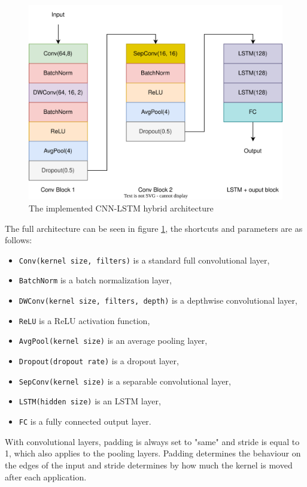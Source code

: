 \documentclass[english, he, bc, kiv, iso690alph, viewonly]{fasthesis}
\begin{document}
\begin{figure}
	\centering
	\includegraphics[width=\textwidth]{fig/arch}
	\caption{The implemented CNN-LSTM hybrid architecture}
	\label{fig:arch}
\end{figure}

The full architecture can be seen in figure \ref{fig:arch}, the shortcuts and parameters are as follows:

\begin{itemize}
	\item\texttt{Conv(kernel size, filters)} is a standard full convolutional layer,
	\item\texttt{BatchNorm} is a batch normalization layer,
	\item\texttt{DWConv(kernel size, filters, depth)} is a depthwise convolutional layer,
	\item\texttt{ReLU} is a ReLU activation function,
	\item\texttt{AvgPool(kernel size)} is an average pooling layer,
	\item\texttt{Dropout(dropout rate)} is a dropout layer,
	\item\texttt{SepConv(kernel size)} is a separable convolutional layer,
	\item\texttt{LSTM(hidden size)} is an LSTM layer,
	\item\texttt{FC} is a fully connected output layer.
\end{itemize}

With convolutional layers, padding is always set to "same" and stride is equal to 1, which also applies to the pooling layers. Padding determines the behaviour on the edges of the input and stride determines by how much the kernel is moved after each application.
\end{document}
